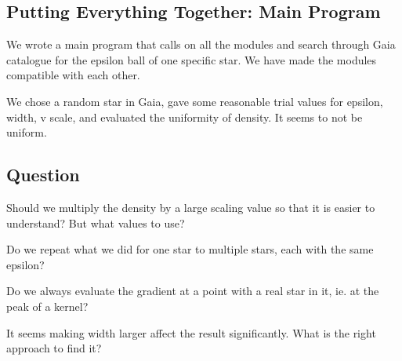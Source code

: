 \documentclass[12pt]{article}
\begin{document}
\subsection{Putting Everything Together: Main Program}
We wrote a main program that calls on all the modules and search through Gaia catalogue for the epsilon ball of one specific star. We have made the modules compatible with each other.

We chose a random star in Gaia, gave some reasonable trial values for epsilon, width, v scale, and evaluated the uniformity of density. It seems to not be uniform.

\subsection*{Question}
Should we multiply the density by a large scaling value so that it is easier to understand? But what values to use?

Do we repeat what we did for one star to multiple stars, each with the same epsilon?

Do we always evaluate the gradient at a point with a real star in it, ie. at the peak of a kernel?

It seems making width larger affect the result significantly. What is the right approach to find it?
 
\end{document}

